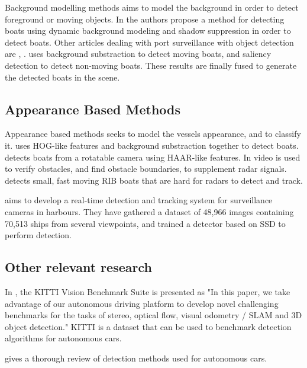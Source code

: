 Background modelling methods aims to model the background in order to detect foreground or moving objects. In \citep{BackgroundWaveletSubstract} the authors propose a method for detecting boats using dynamic background modeling and shadow suppression in order to detect boats. Other articles dealing with port surveillance with object detection are \citep{SeeCoast}, \citep{Pires2010}. \citep{Tran2016} uses background substraction to detect moving boats, and saliency detection to detect non-moving boats. These results are finally fused to generate the detected boats in the scene. 

\subsection{Appearance Based Methods}
Appearance based methods seeks to model the vessels appearance, and to classify it. \citep{HOGdetection} uses HOG-like features and background substraction together to detect boats. \citep{HAARdetection} detects boats from a rotatable camera using HAAR-like features. In \citep{Wedel2007} video is used to verify obstacles, and find obstacle boundaries, to supplement radar signals. \citep{RIBDetection} detects small, fast moving RIB boats that are hard for radars to detect and track.  

\vspace{3mm}

\citep{SSD_detection2018} aims to develop a real-time detection and tracking system for surveillance cameras in harbours. They have gathered a dataset of 48,966 images containing 70,513 ships from several viewpoints, and trained a detector based on SSD \citep{SSD} to perform detection. 


\subsection{Other relevant research}

In \citep{KITTI}, the KITTI Vision Benchmark Suite is presented as "In this paper, we take advantage
of our autonomous driving platform to develop novel challenging
benchmarks for the tasks of stereo, optical flow, visual
odometry / SLAM and 3D object detection."  KITTI is a dataset that can be used to benchmark detection algorithms for autonomous cars.

\citep{Sun2006} gives a thorough review of detection methods used for autonomous cars. 

\vspace{3mm}

